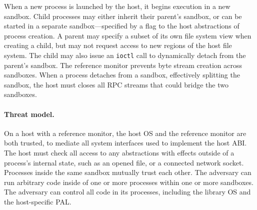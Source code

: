When a new process is launched by the host, it begins execution in a new sandbox.  
Child processes may either inherit their parent's sandbox, or can be started in a separate sandbox---specified by a flag to the host abstractions of process creation.
A parent may specify a subset of its own file system view 
when creating a child, but may not request access to new regions of the host file system. 
The child may also issue an {\tt ioctl} call to 
dynamically detach from the parent's sandbox. The reference monitor prevents byte stream creation across sandboxes.
When a process detaches from a sandbox, effectively splitting the sandbox, the host must closes all RPC streams that could bridge the two sandboxes.

\paragraph{Threat model.}
On a host with a reference monitor, the host OS and the reference monitor are both trusted, to mediate all system interfaces used to implement the host ABI. The host must check all access to any abstractions with effects outside of a process's internal state, such as an opened file, or a connected network socket.
Processes inside the same sandbox mutually trust each other. The adversary can run arbitrary code inside of one or more processes within one or more sandboxes.
The adversary can control all code in its processes, including the library OS and the host-specific PAL.



